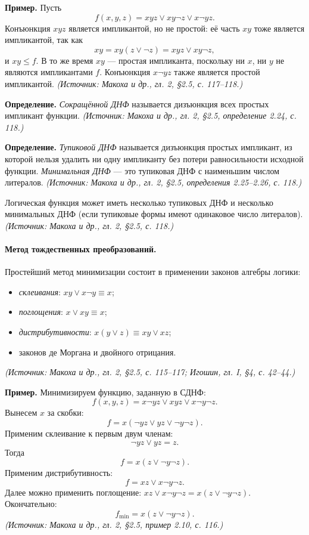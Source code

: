 \documentclass[a4paper,12pt]{article}
\begin{document}
\textbf{Пример.} Пусть
\[
f(x,y,z)=xyz\lor xy\neg z\lor x\neg yz.
\]
Конъюнкция \(xyz\) является импликантой, но не простой: её часть \(xy\) тоже является импликантой, так как
\[
xy=xy(z\lor\neg z)=xyz\lor xy\neg z,
\]
и \(xy\le f\). В то же время \(xy\) — простая импликанта, поскольку ни \(x\), ни \(y\) не являются импликантами \(f\). Конъюнкция \(x\neg yz\) также является простой импликантой.
\textit{(Источник: Макоха и др., гл. 2, §2.5, с. 117--118.)}

\textbf{Определение.} \emph{Сокращённой ДНФ} называется дизъюнкция всех простых импликант функции.
\textit{(Источник: Макоха и др., гл. 2, §2.5, определение 2.24, с. 118.)}

\textbf{Определение.} \emph{Тупиковой ДНФ} называется дизъюнкция простых импликант, из которой нельзя удалить ни одну импликанту без потери равносильности исходной функции. \emph{Минимальная ДНФ} — это тупиковая ДНФ с наименьшим числом литералов.
\textit{(Источник: Макоха и др., гл. 2, §2.5, определения 2.25--2.26, с. 118.)}

Логическая функция может иметь несколько тупиковых ДНФ и несколько минимальных ДНФ (если тупиковые формы имеют одинаковое число литералов).
\textit{(Источник: Макоха и др., гл. 2, §2.5, с. 118.)}

\paragraph{Метод тождественных преобразований.}
Простейший метод минимизации состоит в применении законов алгебры логики:
\begin{itemize}
\item \emph{склеивания}: \(xy\lor x\neg y\equiv x\);
\item \emph{поглощения}: \(x\lor xy\equiv x\);
\item \emph{дистрибутивности}: \(x(y\lor z)\equiv xy\lor xz\);
\item законов де Моргана и двойного отрицания.
\end{itemize}
\textit{(Источник: Макоха и др., гл. 2, §2.5, с. 115--117; Игошин, гл. I, §4, с. 42--44.)}

\textbf{Пример.} Минимизируем функцию, заданную в СДНФ:
\[
f(x,y,z)=x\neg yz\lor xyz\lor x\neg y\neg z.
\]
Вынесем \(x\) за скобки:
\[
f=x(\neg yz\lor yz\lor\neg y\neg z).
\]
Применим склеивание к первым двум членам:
\[
\neg yz\lor yz=z.
\]
Тогда
\[
f=x(z\lor\neg y\neg z).
\]
Применим дистрибутивность:
\[
f=xz\lor x\neg y\neg z.
\]
Далее можно применить поглощение: \(xz\lor x\neg y\neg z = x(z\lor\neg y\neg z)\). Окончательно:
\[
f_{\min}=x(z\lor\neg y\neg z).
\]
\textit{(Источник: Макоха и др., гл. 2, §2.5, пример 2.10, с. 116.)}
\end{document}
